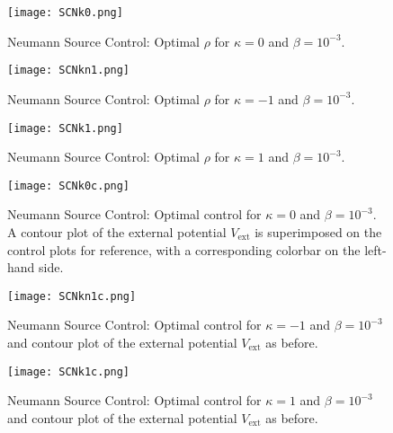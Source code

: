 

\begin{figure}[h]
	\centering
	\texttt{[image: SCNk0.png]}
	\caption{Neumann Source Control: Optimal $\rho$ for $\kappa = 0$ and $\beta = 10^{-3}$.} 
	\label{FSCN1}
\end{figure}
\begin{figure}[h]
	\centering
	\texttt{[image: SCNkn1.png]}
	\caption{Neumann Source Control: Optimal $\rho$ for $\kappa = -1$ and $\beta = 10^{-3}$.} 
	\label{FSCN2}
\end{figure}
\begin{figure}[h]
	\centering
	\texttt{[image: SCNk1.png]}
	\caption{Neumann Source Control: Optimal $\rho$ for $\kappa = 1$ and $\beta = 10^{-3}$.} 
	\label{FSCN3}
\end{figure}


\begin{figure}[h]
	\centering
	\texttt{[image: SCNk0c.png]}
	\caption{Neumann Source Control: Optimal control for $\kappa = 0$ and $\beta = 10^{-3}$. A contour plot of the external potential \emph{$V_{\text{ext}}$} is superimposed on the control plots for reference, with a corresponding colorbar on the left-hand side.} 
	\label{FSCN1c}
\end{figure}
\begin{figure}[h]
	\centering
	\texttt{[image: SCNkn1c.png]}
	\caption{Neumann Source Control: Optimal control for $\kappa = -1$ and $\beta = 10^{-3}$ and contour plot of the external potential \emph{$V_{\text{ext}}$} as before.} 
	\label{FSCN2c}
\end{figure}
\begin{figure}[h]
	\centering
	\texttt{[image: SCNk1c.png]}
	\caption{Neumann Source Control: Optimal control for $\kappa = 1$ and $\beta = 10^{-3}$ and contour plot of the external potential \emph{$V_{\text{ext}}$} as before.} 
	\label{FSCN3c}
\end{figure}


